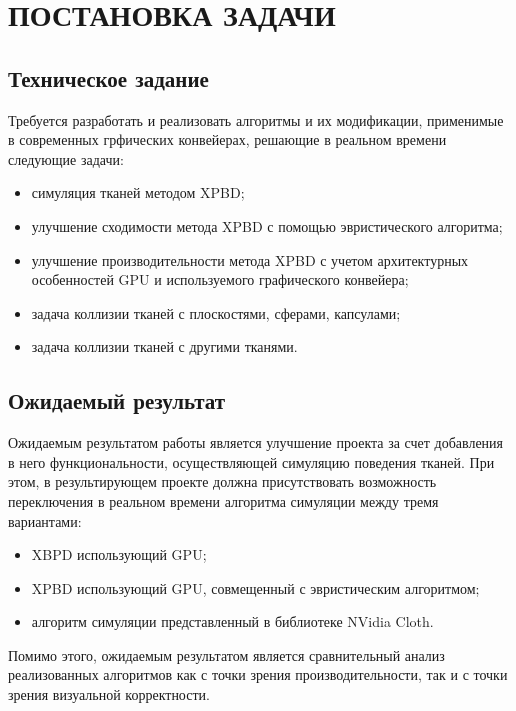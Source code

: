 \chapter{ПОСТАНОВКА ЗАДАЧИ} \label{ch1}

\section{Техническое задание} \label{ch1:sec1}
Требуется разработать и реализовать алгоритмы и их модификации, применимые в современных грфических конвейерах, решающие в реальном времени следующие задачи:
\begin{itemize}
	\item симуляция тканей методом XPBD;
	\item улучшение сходимости метода XPBD с помощью эвристического алгоритма;
	\item улучшение производительности метода XPBD с учетом архитектурных особенностей GPU и используемого графического конвейера;
	\item задача коллизии тканей с плоскостями, сферами, капсулами;
	\item задача коллизии тканей с другими тканями.
\end{itemize}

\section{Ожидаемый результат} \label{ch1:sec2}
Ожидаемым результатом работы является улучшение проекта  за счет добавления в него функциональности, осуществляющей симуляцию поведения тканей. При этом, в результирующем проекте должна присутствовать возможность переключения в реальном времени алгоритма симуляции между тремя вариантами: 
\begin{itemize}
	\item XBPD использующий GPU;
	\item XPBD использующий GPU, совмещенный с эвристическим алгоритмом;
	\item алгоритм симуляции представленный в библиотеке NVidia Cloth.
\end{itemize}

Помимо этого, ожидаемым результатом является сравнительный анализ реализованных алгоритмов как с точки зрения производительности, так и с точки зрения визуальной корректности.



